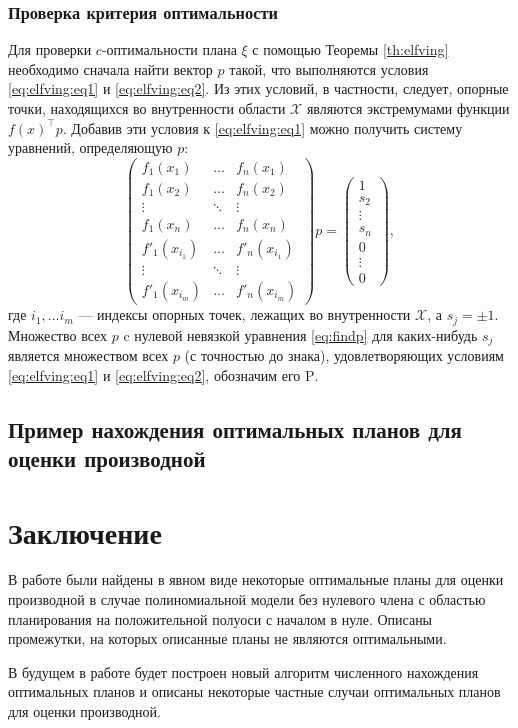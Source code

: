 \documentclass[specialist,
               substylefile = spbu.rtx,
               subf,href,colorlinks=true, 12pt]{disser}
\theoremstyle{definition}
\begin{document}
	\subsection{Проверка критерия оптимальности}
	Для проверки $c$-оптимальности плана $\xi$ с помощью Теоремы \ref{th:elfving} необходимо сначала найти вектор $p$  такой, что выполняются условия \eqref{eq:elfving:eq1} и \eqref{eq:elfving:eq2}. Из этих условий, в частности, следует, опорные точки, находящихся во внутренности области $\mathcal{X}$ являются экстремумами функции $f(x)^\top p$. Добавив эти условия к \eqref{eq:elfving:eq1} можно получить систему уравнений, определяющую $p$:
	 \begin{equation}
	 \label{eq:findp}
		\begin{pmatrix}
			f_1(x_1) & \dots & f_n(x_1) \\
			f_1(x_2) & \dots & f_n(x_2) \\
  			\vdots &   \ddots & \vdots \\
  			f_1(x_n)  & \dots & f_n(x_n) \\
  			f'_1(x_{i_1}) & \dots & f'_n(x_{i_1}) \\
  			\vdots &   \ddots & \vdots \\
  			f'_1(x_{i_m})  & \dots & f'_n(x_{i_m})
		\end{pmatrix} 
		p =
		\begin{pmatrix}
			1 \\ s_2 \\ \vdots \\ s_n \\ 0 \\ \vdots \\ 0
		\end{pmatrix},
	\end{equation}
	где $i_1, \ldots i_m$ --- индексы опорных точек, лежащих во внутренности $\mathcal{X}$, а $s_j = \pm 1$. Множество всех  $p$ c нулевой невязкой уравнения \eqref{eq:findp} для каких-нибудь $s_j$ является множеством всех $p$ (с точностью до знака), удовлетворяющих условиям  \eqref{eq:elfving:eq1} и \eqref{eq:elfving:eq2}, обозначим его $\mathrm{P}$.
	\section{Пример нахождения оптимальных планов для оценки производной}
	
\chapter*{Заключение}
	В работе были найдены в явном виде некоторые оптимальные планы для оценки производной в случае полиномиальной модели без нулевого члена с областью планирования на положительной полуоси с началом в нуле. Описаны промежутки, на которых описанные планы не являются оптимальными.
	
	В будущем в работе будет построен новый алгоритм численного нахождения оптимальных планов и описаны некоторые частные случаи оптимальных планов для оценки производной.
	
	\nocite{*}
	
	
	
\end{document}

